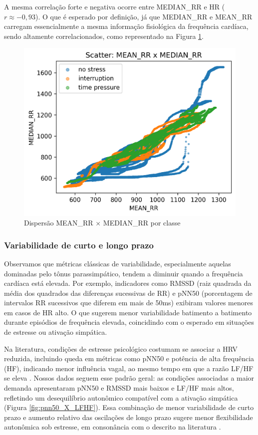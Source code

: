 \documentclass[conference]{IEEEtran}
\begin{document}
A mesma correlação forte e negativa ocorre entre MEDIAN\_RR e HR ($r\approx -0,93$). O que é esperado por definição, já que MEDIAN\_RR e MEAN\_RR carregam essencialmente a mesma informação fisiológica da frequência cardíaca, sendo altamente correlacionados, como representado na Figura \ref{fig:mean_median_rr}.

\begin{figure}[H]
    \centering
    \includegraphics[width=0.8\linewidth]{../../../images/Anderson/Scatter_Condicional/Scatter MEAN_RR x MEDIAN_RR.png}
    \caption{Dispersão MEAN\_RR × MEDIAN\_RR por classe}
    \label{fig:mean_median_rr}
\end{figure}

\subsubsection{Variabilidade de curto e longo prazo}

Observamos que métricas clássicas de variabilidade, especialmente aquelas dominadas pelo tônus parassimpático, tendem a diminuir quando a frequência cardíaca está elevada. Por exemplo, indicadores como RMSSD (raiz quadrada da média dos quadrados das diferenças sucessivas de RR) e pNN50 (porcentagem de intervalos RR sucessivos que diferem em mais de 50ms) exibiram valores menores em casos de HR alto. O que sugerem menor variabilidade batimento a batimento durante episódios de frequência elevada, coincidindo com o esperado em situações de estresse ou ativação simpática.

Na literatura, condições de estresse psicológico costumam se associar a HRV reduzida, incluindo queda em métricas como pNN50 e potência de alta frequência (HF), indicando menor influência vagal, ao mesmo tempo em que a razão LF/HF se eleva \cite{R1}. Nossos dados seguem esse padrão geral: as condições associadas a maior demanda apresentaram pNN50 e RMSSD mais baixos e LF/HF mais altos, refletindo um desequilíbrio autonômico compatível com a ativação simpática (Figura \ref{fig:pnn50_X_LFHF}). Essa combinação de menor variabilidade de curto prazo e aumento relativo das oscilações de longo prazo sugere menor flexibilidade autonômica sob estresse, em consonância com o descrito na literatura \cite{R1}.
\end{document}
